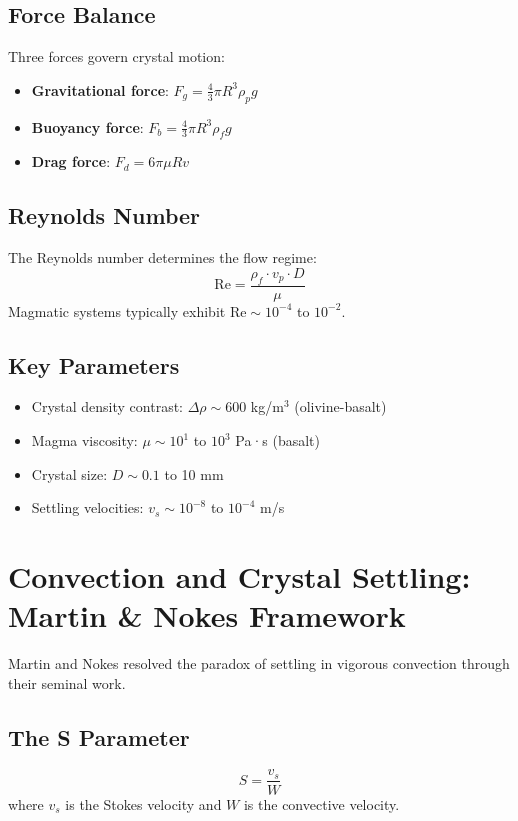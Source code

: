 \subsection{Force Balance}
Three forces govern crystal motion:
\begin{itemize}
    \item \textbf{Gravitational force}: $F_g = \frac{4}{3}\pi R^3 \rho_p g$
    \item \textbf{Buoyancy force}: $F_b = \frac{4}{3}\pi R^3 \rho_f g$
    \item \textbf{Drag force}: $F_d = 6\pi\mu R v$
\end{itemize}

\subsection{Reynolds Number}
The Reynolds number determines the flow regime:
\begin{equation}
\text{Re} = \frac{\rho_f \cdot v_p \cdot D}{\mu}
\end{equation}
Magmatic systems typically exhibit $\text{Re} \sim 10^{-4}$ to $10^{-2}$.

\subsection{Key Parameters}
\begin{itemize}
    \item Crystal density contrast: $\Delta\rho \sim 600$ kg/m$^3$ (olivine-basalt)
    \item Magma viscosity: $\mu \sim 10^1$ to $10^3$ Pa·s (basalt)
    \item Crystal size: $D \sim 0.1$ to 10 mm
    \item Settling velocities: $v_s \sim 10^{-8}$ to $10^{-4}$ m/s
\end{itemize}

\section{Convection and Crystal Settling: Martin \& Nokes Framework}

Martin and Nokes \cite{martin1988,martin1989} resolved the paradox of settling in vigorous convection through their seminal work.

\subsection{The S Parameter}
\begin{equation}
S = \frac{v_s}{W}
\end{equation}
where $v_s$ is the Stokes velocity and $W$ is the convective velocity.

